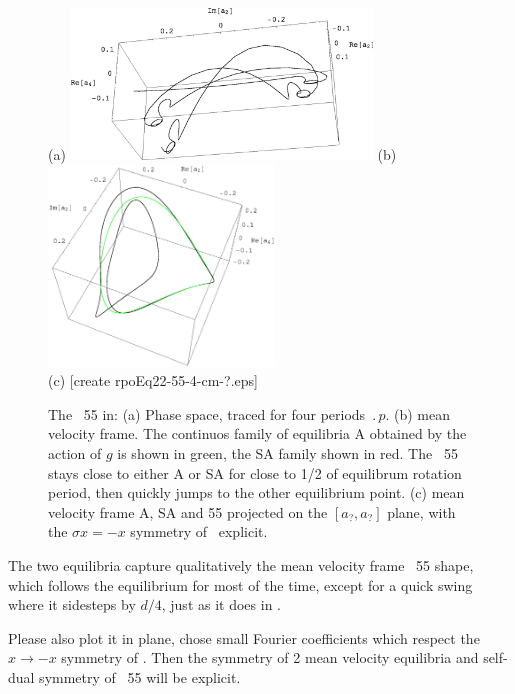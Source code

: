 \begin{figure}[t] %
\centering
(a) \includegraphics[width=8.0cm]{figs/rpo22-55-4-clean.eps}
%
\hspace{0.1in}
(b) \includegraphics[width=6.0cm]{figs/rpoEq22-55-4-cm.eps}
\\
(c) [create rpoEq22-55-4-cm-?.eps]
\caption{
 The \rpo\ {\nameit}55 in: 
 (a) Phase space, traced for four periods $\period{p}$.
 (b) mean velocity frame. 
        The continuos family of 
	equilibria A obtained by the action of $g$ is shown in green,
	the SA family shown in red. The \rpo\ {\nameit}55 stays close
	to either A or SA for close to 1/2 of equilibrum rotation
	period, then quickly jumps to the other equilibrium point.
 (c) mean velocity frame A, SA and {\nameit}55 projected on the 
	$[a_?,a_?]$ plane,
	with the $\sigma x = -x$ symmetry of \KSe\ explicit.
        }
\label{f:rpo55}
\end{figure}


The two equilibria
capture qualitatively the mean velocity frame \rpo\ {\nameit}55 shape,
which follows the
equilibrium for most of the time, except for a quick swing where it
sidesteps by $d/4$, just as it does in . 

Please also plot it in plane, chose small Fourier coefficients
 which respect the $x \to -x$ symmetry of \KSe.
Then the symmetry of 2 mean velocity
equilibria and self-dual symmetry of \rpo\ {\nameit}55 will be explicit.

